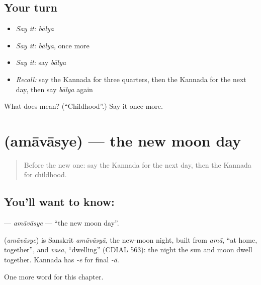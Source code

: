 \subsection*{Your turn}
\begin{itemize}
\raggedright
  \item \emph{Say it:} \emph{bālya}
  \item \emph{Say it:} \emph{bālya}, once more
  \item \emph{Say it:} say \emph{bālya}
  \item \emph{Recall:} say the Kannada for three quarters, then the Kannada for the next day, then say \emph{bālya} again
\end{itemize}

\begin{tcolorbox}[breakable,colback=teal!4,colframe=teal!35!black,title={Before you move on}]
What does  mean? (\textquotedblleft{}Childhood\textquotedblright{}.) Say it once more.
\end{tcolorbox}
\section[\texorpdfstring{\kn{ಅಮಾವಾಸ್ಯೆ} (amāvāsye)}{ಅಮಾವಾಸ್ಯೆ (amāvāsye)}]{ (amāvāsye) — the new moon day}

\label{lesson:KA-C285-amavasye}



\begin{quote}
Before the new one: say the Kannada for the next day, then the Kannada for childhood.
\end{quote}

\subsection*{You'll want to know: }
\textbf{} — \emph{amāvāsye} — \textquotedblleft{}the new moon day\textquotedblright{}.

\begin{cousinweb}
\textbf{} (\emph{amāvāsye}) is Sanskrit \emph{amāvāsyā}, the new-moon night, built from \emph{amā}, \textquotedblleft{}at home, together\textquotedblright{}, and \emph{vāsa}, \textquotedblleft{}dwelling\textquotedblright{} (CDIAL 563): the night the sun and moon dwell together. Kannada has \emph{-e} for final \emph{-ā}.
\end{cousinweb}

\begin{grammarlens}[title={What you've built}]
One more word for this chapter.
\end{grammarlens}

